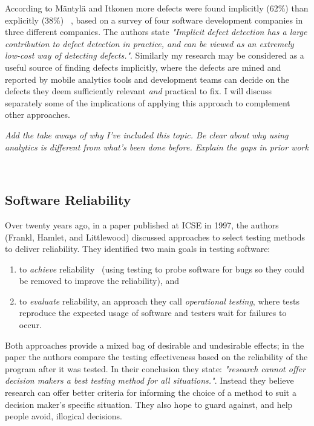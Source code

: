 According to Mäntylä and Itkonen more defects were found implicitly (62\%) than explicitly (38\%) ~\cite{mantyla2014_how_are_software_defects_found}, based on a survey of four software development companies in three different companies. The authors state \emph{"Implicit defect detection has a large contribution to defect detection in practice, and can be viewed as
an extremely low-cost way of detecting defects."}. Similarly my research may be considered as a useful source of finding defects implicitly, where the defects are mined and reported by mobile analytics tools and development teams can decide on the defects they deem sufficiently relevant \emph{and} practical to fix. I will discuss separately some of the implications of applying this approach to complement other approaches.

\emph{Add the take aways of why I've included this topic. Be clear about why using analytics is different from what's been done before. Explain the gaps in prior work}

~\hypertarget{software.reliability}{}
\subsection{Software Reliability}
Over twenty years ago, in a paper published at ICSE in 1997, the authors (Frankl, Hamlet, and Littlewood) discussed approaches to select testing methods to deliver reliability. They identified two main goals in testing software: 
\begin{enumerate}
    \item to \emph{achieve} reliability~\cite{frankl1997choosing_testing_for_reliability} (using testing to probe software for bugs so they could be removed to improve the reliability), and 
    \item to \emph{evaluate} reliability, an approach they call \emph{operational testing}, where tests reproduce the expected usage of software and testers wait for failures to occur.
\end{enumerate}

Both approaches provide a mixed bag of desirable and undesirable effects; in the paper the authors compare the testing effectiveness based on the reliability of the program after it was tested. In their conclusion they state: \emph{"research cannot offer decision makers a best testing method for all situations."}. Instead they believe research can offer better criteria for informing the choice of a method to suit a decision maker's specific situation. They also hope to guard against, and help people avoid, illogical decisions.

